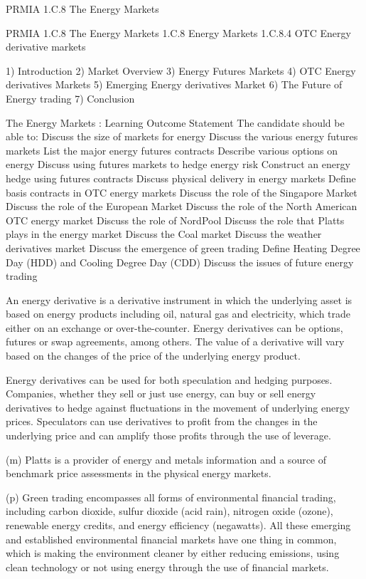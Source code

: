 PRMIA 1.C.8 The Energy Markets 

PRMIA 1.C.8 The Energy Markets
1.C.8 Energy Markets
1.C.8.4 OTC Energy derivative markets

1) Introduction
2) Market Overview
3) Energy Futures Markets
4) OTC Energy derivatives Markets
5) Emerging Energy derivatives Market
6) The Future of Energy trading
7) Conclusion

The Energy Markets : Learning Outcome Statement
The candidate should be able to:
  Discuss the size of markets for energy
  Discuss the various energy futures markets
  List the major energy futures contracts
  Describe various options on energy
  Discuss using futures markets to hedge energy risk
  Construct an energy hedge using futures contracts
  Discuss physical delivery in energy markets
  Define basis contracts in OTC energy markets
  Discuss the role of the Singapore Market
  Discuss the role of the European Market
  Discuss the role of the North American OTC energy market
  Discuss the role of NordPool
  Discuss the role that Platts plays in the energy market
  Discuss the Coal market
  Discuss the weather derivatives market
  Discuss the emergence of green trading
  Define Heating Degree Day (HDD) and Cooling Degree Day (CDD)
  Discuss the issues of future energy trading


An energy derivative is a derivative instrument in which the underlying asset is based on energy products including oil, natural gas and electricity, which trade either on an exchange or over-the-counter. Energy derivatives can be options, futures or swap agreements, among others. The value of a derivative will vary based on the changes of the price of the underlying energy product. 

Energy derivatives can be used for both speculation and hedging purposes. Companies, whether they sell or just use energy, can buy or sell energy derivatives to hedge against fluctuations in the movement of underlying energy prices. Speculators can use derivatives to profit from the changes in the underlying price and can amplify those profits through the use of leverage.


(m) Platts is a provider of energy and metals information and a source of benchmark price assessments in the physical energy markets. 

(p) Green trading encompasses all forms of environmental financial trading, including carbon dioxide, sulfur dioxide (acid rain), nitrogen oxide (ozone), renewable energy credits, and energy efficiency (negawatts). All these emerging and established environmental financial markets have one thing in common, which is making the environment cleaner by either reducing emissions, using clean technology or not using energy through the use of financial markets.

